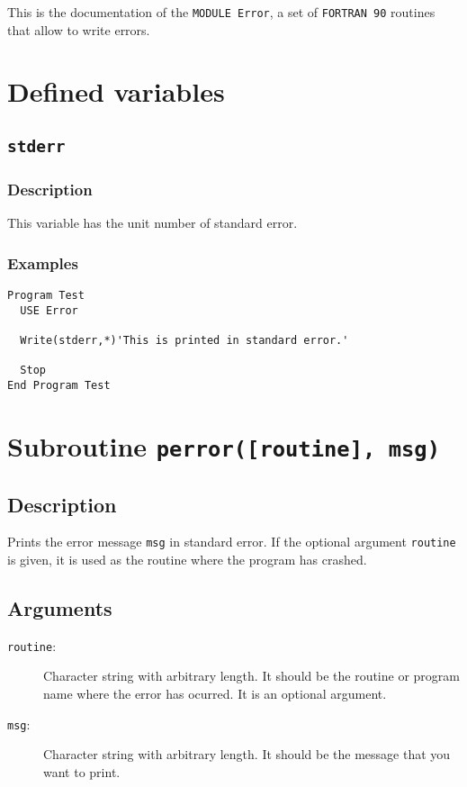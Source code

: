 This is the documentation of the \texttt{MODULE Error}, a set
of \texttt{FORTRAN 90} routines that allow to write errors.


\section{Defined variables}

\subsection{\texttt{stderr}}

\subsubsection{Description}

This variable has the unit number of standard error.

\subsubsection{Examples}

\begin{verbatim}
Program Test
  USE Error

  Write(stderr,*)'This is printed in standard error.'

  Stop
End Program Test
\end{verbatim}


\section{Subroutine \texttt{perror([routine], msg)}}

\subsection{Description}

Prints the error message \texttt{msg} in standard error. If the
optional argument \texttt{routine} is given, it is used as the routine
where the program has crashed.

\subsection{Arguments}

\begin{description}
\item[\texttt{routine}:] Character string with arbitrary length. It
  should be the routine or program name where the error has
  ocurred. It is an optional argument.
\item[\texttt{msg}:] Character string with arbitrary length. It
  should be the message that you want to print.
\end{description}



